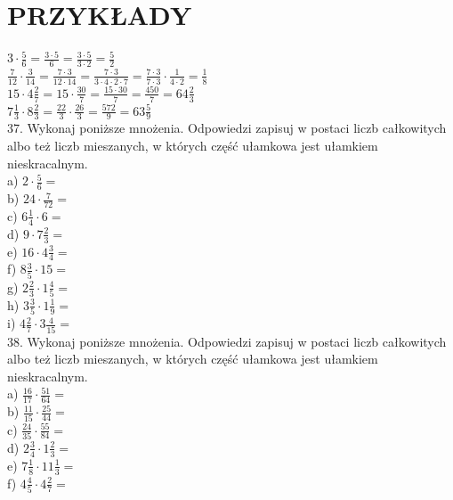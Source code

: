 \documentclass[10pt]{article}
\begin{document}
\section*{PRZYKŁADY}
\(3 \cdot \frac{5}{6}=\frac{3 \cdot 5}{6}=\frac{3 \cdot 5}{3 \cdot 2}=\frac{5}{2}\)\\
\(\frac{7}{12} \cdot \frac{3}{14}=\frac{7 \cdot 3}{12 \cdot 14}=\frac{7 \cdot 3}{3 \cdot 4 \cdot 2 \cdot 7}=\frac{7 \cdot 3}{7 \cdot 3} \cdot \frac{1}{4 \cdot 2}=\frac{1}{8}\)\\
\(15 \cdot 4 \frac{2}{7}=15 \cdot \frac{30}{7}=\frac{15 \cdot 30}{7}=\frac{450}{7}=64 \frac{2}{3}\)\\
\(7 \frac{1}{3} \cdot 8 \frac{2}{3}=\frac{22}{3} \cdot \frac{26}{3}=\frac{572}{9}=63 \frac{5}{9}\)\\
37. Wykonaj poniższe mnożenia. Odpowiedzi zapisuj w postaci liczb całkowitych albo też liczb mieszanych, w których część ułamkowa jest ułamkiem nieskracalnym.\\
a) \(2 \cdot \frac{5}{6}=\)\\
b) \(24 \cdot \frac{7}{72}=\)\\
c) \(6 \frac{1}{4} \cdot 6=\)\\
d) \(9 \cdot 7 \frac{2}{3}=\)\\
e) \(16 \cdot 4 \frac{3}{4}=\)\\
f) \(8 \frac{3}{5} \cdot 15=\)\\
g) \(2 \frac{2}{3} \cdot 1 \frac{4}{5}=\)\\
h) \(3 \frac{3}{5} \cdot 1 \frac{1}{9}=\)\\
i) \(4 \frac{2}{7} \cdot 3 \frac{4}{15}=\)\\
38. Wykonaj poniższe mnożenia. Odpowiedzi zapisuj w postaci liczb całkowitych albo też liczb mieszanych, w których część ułamkowa jest ułamkiem nieskracalnym.\\
a) \(\frac{16}{17} \cdot \frac{51}{64}=\)\\
b) \(\frac{11}{15} \cdot \frac{25}{44}=\)\\
c) \(\frac{24}{35} \cdot \frac{55}{84}=\)\\
d) \(2 \frac{3}{4} \cdot 1 \frac{2}{3}=\)\\
e) \(7 \frac{1}{8} \cdot 11 \frac{1}{3}=\)\\
f) \(4 \frac{4}{5} \cdot 4 \frac{2}{7}=\)
\end{document}
